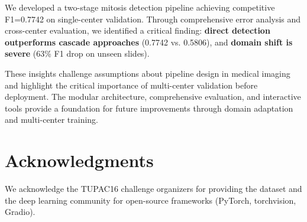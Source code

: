 \documentclass[11pt,a4paper]{article}
\begin{document}
We developed a two-stage mitosis detection pipeline achieving competitive 
F1=0.7742 on single-center validation. Through comprehensive error analysis 
and cross-center evaluation, we identified a critical finding: \textbf{direct 
detection outperforms cascade approaches} (0.7742 vs. 0.5806), and 
\textbf{domain shift is severe} (63\% F1 drop on unseen slides).

These insights challenge assumptions about pipeline design in medical imaging 
and highlight the critical importance of multi-center validation before 
deployment. The modular architecture, comprehensive evaluation, and 
interactive tools provide a foundation for future improvements through 
domain adaptation and multi-center training.

\section*{Acknowledgments}

We acknowledge the TUPAC16 challenge organizers for providing the dataset 
and the deep learning community for open-source frameworks (PyTorch, 
torchvision, Gradio).
\end{document}
